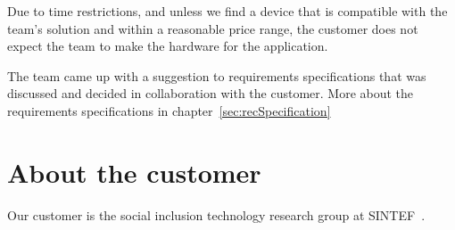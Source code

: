 Due to time restrictions, and unless we find a device that is compatible with the team's solution and within a reasonable price range, the customer does not expect the team to make the hardware for the application.

The team came up with a suggestion to requirements specifications that was discussed and decided in collaboration with the customer. More about the requirements specifications in chapter~\ref{sec:recSpecification}

\section{About the customer}

Our customer is the social inclusion technology research group at SINTEF~\cite{sintef}.



